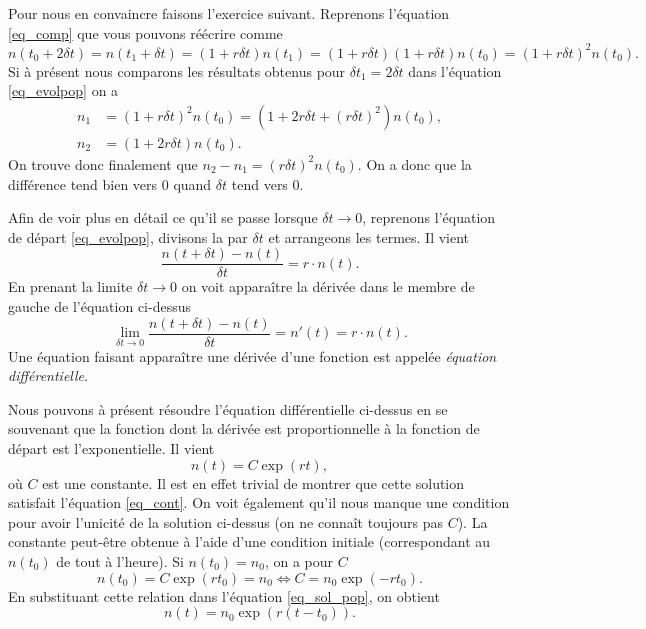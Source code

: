 \documentclass[a4paper,12pt]{book}
\begin{document}
Pour nous en convaincre faisons l'exercice suivant. 
Reprenons l'équation \eqref{eq_comp} que vous pouvons réécrire comme
\begin{equation}
 n(t_0+2\delta t)=n(t_1+\delta t)=(1+r\delta t) n(t_1)=(1+r  \delta t)(1+r  \delta t) n(t_0)=(1+r\delta t)^2 n(t_0).
\end{equation}
Si à présent nous comparons les résultats obtenus pour $\delta t_1=2\delta t$ dans l'équation \eqref{eq_evolpop} on a
\begin{align}
 n_1&=(1+r\delta t)^2 n(t_0)=(1+2r\delta t+(r\delta t)^2) n(t_0),\\
 n_2&=(1+2r\delta t) n(t_0).
\end{align}
On trouve donc finalement que $n_2-n_1=(r\delta t)^2n(t_0)$. On a donc que la différence tend bien vers 0 quand $\delta t$ tend vers 0.

Afin de voir plus en détail ce qu'il se passe lorsque $\delta t\rightarrow 0$, reprenons l'équation de départ \eqref{eq_evolpop},
divisons la par $\delta t$ et arrangeons les termes. Il vient
\begin{equation}
 \frac{n(t+\delta t)-n(t)}{\delta t}=r\cdot n(t).
\end{equation}
En prenant la limite $\delta t\rightarrow 0$ on voit apparaître la dérivée dans le membre de gauche de l'équation ci-dessus
\begin{equation}
 \lim\limits_{\delta t\rightarrow 0} \frac{n(t+\delta t)-n(t)}{\delta t}=n'(t)=r\cdot n(t).\label{eq_cont}
\end{equation}
Une équation faisant apparaître une dérivée d'une fonction est appelée \textit{équation différentielle}.

Nous pouvons à présent résoudre l'équation différentielle ci-dessus en se souvenant que 
la fonction dont la dérivée est proportionnelle à la fonction de départ est l'exponentielle.
Il vient
\begin{equation}
 n(t)=C\exp(r t),\label{eq_sol_pop}
\end{equation}
où $C$ est une constante.
Il est en effet trivial de montrer que cette solution satisfait l'équation \eqref{eq_cont}. 
On voit également qu'il nous manque une condition pour avoir l'unicité de la solution ci-dessus (on
ne connaît toujours pas $C$). La constante peut-être obtenue à l'aide d'une condition initiale (correspondant 
au $n(t_0)$ de tout à l'heure). Si $n(t_0)=n_0$, on a pour $C$
\begin{equation}
 n(t_0)=C\exp(r t_0)=n_0 \Leftrightarrow C=n_0\exp(-r t_0).
\end{equation}
En substituant cette relation dans l'équation \eqref{eq_sol_pop}, on obtient
\begin{equation}
 n(t)=n_0\exp(r (t-t_0)).
\end{equation}
\end{document}
